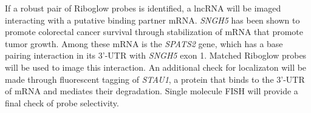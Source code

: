 If a robust pair of Riboglow probes is identified, a lncRNA will be imaged interacting with a putative binding partner mRNA. \textit{SNGH5} has been shown to promote colorectal cancer survival through stabilization of mRNA that promote tumor growth\cite{DamasSNHG5promotescolorectal2016}. Among these mRNA is the \textit{SPATS2} gene, which has a base pairing interaction in its 3'-UTR with \textit{SNGH5} exon 1. Matched Riboglow probes will be used to image this interaction.
An additional check for localizaton will be made through fluorescent tagging of \textit{STAU1}, a protein that binds to the 3'-UTR of mRNA and mediates their degradation\cite{ParkEonyoungStaufenmediatedmRNA2013}. Single molecule FISH will provide a final check of probe selectivity.





